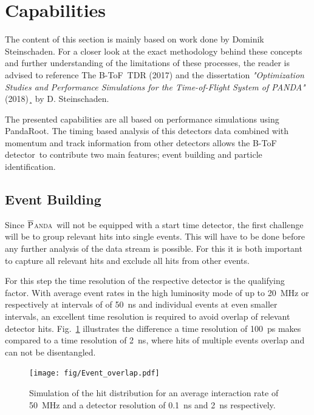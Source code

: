 \documentclass[12pt,a4paper,oneside]{article}
\newcommand{\fig}{Fig.}
\newcommand{\panda}{\textsc{$\overline{\textsc{P}}$anda}}
\newcommand{\btof}{B-ToF}
\newcommand{\btofD}{B-ToF detector}
\begin{document}
\section{Capabilities}

The content of this section is mainly based on work done by Dominik Steinschaden.
For a closer look at the exact methodology behind these concepts and further understanding of the limitations of these processes, the reader is advised to reference The \btof\ TDR (2017) and the dissertation \emph{"Optimization Studies and Performance Simulations for the Time-of-Flight System of PANDA"} (2018)¸ by D. Steinschaden.

The presented capabilities are all based on performance simulations using PandaRoot. The timing based analysis of this detectors data combined with momentum and track information from other detectors allows the \btofD\ to contribute two main features; event building and particle identification.

\subsection{Event Building}

Since \panda\ will not be equipped with a start time detector, the first challenge will be to group relevant hits into single events. This will have to be done before any further analysis of the data stream is possible. For this it is both important to capture all relevant hits and exclude all hits from other events.

For this step the time resolution of the respective detector is the qualifying factor. With average event rates in the high luminosity mode of up to \SI{20}{MHz} or respectively at intervals of of \SI{50}{ns} and individual events at even smaller intervals, an excellent time resolution is required to avoid overlap of relevant detector hits. \fig~\ref{fig:Event_overlap} illustrates the difference a time resolution of \SI{100}{ps} makes compared to a time resolution of \SI{2}{ns}, where hits of multiple events overlap and can not be disentangled.

\begin{figure}
	\centering
	\texttt{[image: fig/Event\_overlap.pdf]}
	\caption{Simulation of the hit distribution for an average interaction rate of \SI{50}{MHz} and a detector resolution of \SI{0.1}{ns} and \SI{2}{ns} respectively.}
	\label{fig:Event_overlap}
\end{figure}
\end{document}
